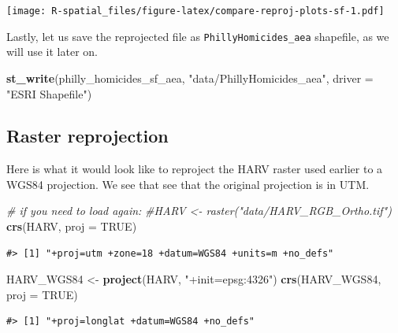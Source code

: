 \documentclass[
]{book}
\newenvironment{Shaded}{\begin{snugshade}}{\end{snugshade}}
\newcommand{\AttributeTok}[1]{\textcolor[rgb]{0.13,0.29,0.53}{#1}}
\newcommand{\CommentTok}[1]{\textcolor[rgb]{0.56,0.35,0.01}{\textit{#1}}}
\newcommand{\ConstantTok}[1]{\textcolor[rgb]{0.56,0.35,0.01}{#1}}
\newcommand{\FunctionTok}[1]{\textcolor[rgb]{0.13,0.29,0.53}{\textbf{#1}}}
\newcommand{\NormalTok}[1]{#1}
\newcommand{\OtherTok}[1]{\textcolor[rgb]{0.56,0.35,0.01}{#1}}
\newcommand{\StringTok}[1]{\textcolor[rgb]{0.31,0.60,0.02}{#1}}
\begin{document}
\texttt{[image: R-spatial\_files/figure-latex/compare-reproj-plots-sf-1.pdf]}

Lastly, let us save the reprojected file as \texttt{PhillyHomicides\_aea} shapefile, as we will use it later on.

\begin{Shaded}
\begin{Highlighting}[]
\FunctionTok{st\_write}\NormalTok{(philly\_homicides\_sf\_aea, }\StringTok{"data/PhillyHomicides\_aea"}\NormalTok{, }\AttributeTok{driver =} \StringTok{"ESRI Shapefile"}\NormalTok{)}
\end{Highlighting}
\end{Shaded}

\hypertarget{raster-reprojection}{%
\subsection{Raster reprojection}\label{raster-reprojection}}

Here is what it would look like to reproject the HARV raster used earlier to a WGS84 projection. We see that see that the original projection is in UTM.

\begin{Shaded}
\begin{Highlighting}[]
\CommentTok{\# if you need to load again:}
\CommentTok{\#HARV \textless{}{-} raster("data/HARV\_RGB\_Ortho.tif")}
\FunctionTok{crs}\NormalTok{(HARV, }\AttributeTok{proj =} \ConstantTok{TRUE}\NormalTok{)}
\end{Highlighting}
\end{Shaded}

\begin{verbatim}
#> [1] "+proj=utm +zone=18 +datum=WGS84 +units=m +no_defs"
\end{verbatim}

\begin{Shaded}
\begin{Highlighting}[]
\NormalTok{HARV\_WGS84 }\OtherTok{\textless{}{-}} \FunctionTok{project}\NormalTok{(HARV, }\StringTok{"+init=epsg:4326"}\NormalTok{)}
\FunctionTok{crs}\NormalTok{(HARV\_WGS84, }\AttributeTok{proj =} \ConstantTok{TRUE}\NormalTok{)}
\end{Highlighting}
\end{Shaded}

\begin{verbatim}
#> [1] "+proj=longlat +datum=WGS84 +no_defs"
\end{verbatim}
\end{document}
